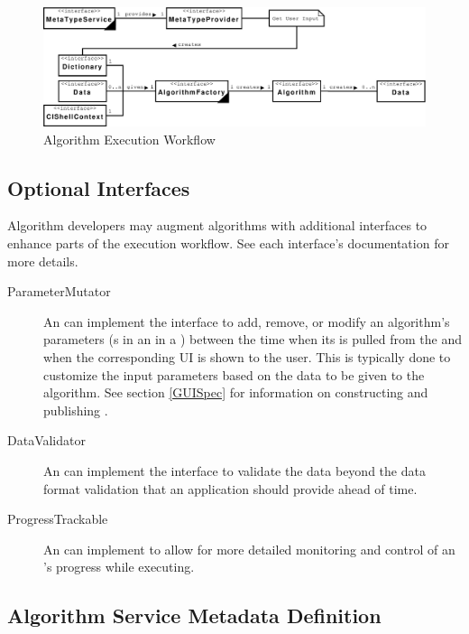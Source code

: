 \begin{figure}[htb!]
\centering
\includegraphics[width=150mm]{../img/algExecWorkflow.pdf}
\caption{Algorithm Execution Workflow}
\label{fig:algExecWorkflow}
\end{figure}

\subsection{Optional Interfaces}

Algorithm developers may augment algorithms with additional interfaces to enhance
parts of the execution workflow. See each interface's documentation for more
details.

\begin{description}
  \item[ParameterMutator] An  can implement the
   interface to add, remove, or modify an algorithm's
  parameters (s in an 
  in a ) between the time when its
   is pulled from the  and when
  the corresponding UI is shown to the user. This is typically done to
  customize the input parameters based on the data to be given to the
  algorithm. See section \ref{GUISpec} for information on constructing and
  publishing .
  
  \item[DataValidator] An  can implement the
   interface to validate the data beyond the data format
  validation that an application should provide ahead of time.

  \item[ProgressTrackable] An  can implement
   to allow for more detailed monitoring and control
  of an 's progress while executing.
\end{description}

\subsection{Algorithm Service Metadata Definition}
\label{algMetaData}

